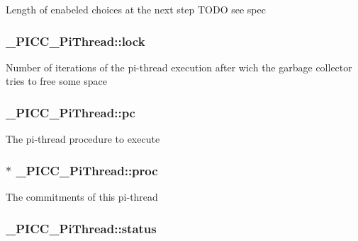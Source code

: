Length of enabeled choices at the next step T\-O\-D\-O see spec \hypertarget{struct__PICC__PiThread_a83441acd517b78752c3766872623b1e6}{
\subsubsection[{lock}]{ \-\_\-\-P\-I\-C\-C\-\_\-\-Pi\-Thread\-::lock}}\label{struct__PICC__PiThread_a83441acd517b78752c3766872623b1e6}
Number of iterations of the pi-\/thread execution after wich the garbage collector tries to free some space \hypertarget{struct__PICC__PiThread_a92b638ec192f3beaa4b3a509124a539d}{
\subsubsection[{pc}]{ \-\_\-\-P\-I\-C\-C\-\_\-\-Pi\-Thread\-::pc}}\label{struct__PICC__PiThread_a92b638ec192f3beaa4b3a509124a539d}
The pi-\/thread procedure to execute \hypertarget{struct__PICC__PiThread_a2ad879cabbe165e57b105c4060c565a1}{
\subsubsection[{proc}]{$\ast$ \-\_\-\-P\-I\-C\-C\-\_\-\-Pi\-Thread\-::proc}}\label{struct__PICC__PiThread_a2ad879cabbe165e57b105c4060c565a1}
The commitments of this pi-\/thread \hypertarget{struct__PICC__PiThread_a08e8708363d2deb97335407398229118}{
\subsubsection[{status}]{ \-\_\-\-P\-I\-C\-C\-\_\-\-Pi\-Thread\-::status}}\label{struct__PICC__PiThread_a08e8708363d2deb97335407398229118}
